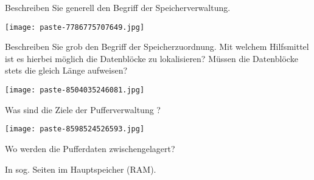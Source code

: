 \documentclass{article}
\begin{document}
\begin{tcolorbox}[colback=white!10!white,colframe=lightgray!75!black,
  savelowerto=\jobname_ex.tex]

\begin{center}
 Beschreiben Sie generell den Begriff der Speicherverwaltung. 

\end{center}

\tcblower

\justifying
\texttt{[image: paste-7786775707649.jpg]}
\end{tcolorbox}
\begin{tcolorbox}[colback=white!10!white,colframe=lightgray!75!black,
  savelowerto=\jobname_ex.tex]

\begin{center}
 Beschreiben Sie grob den Begriff der Speicherzuordnung. Mit welchem Hilfsmittel ist es hierbei möglich die Datenblöcke zu lokalisieren? Müssen die Datenblöcke stets die gleich Länge aufweisen? 

\end{center}

\tcblower

\justifying
\texttt{[image: paste-8504035246081.jpg]}
\end{tcolorbox}
\begin{tcolorbox}[colback=white!10!white,colframe=lightgray!75!black,
  savelowerto=\jobname_ex.tex]

\begin{center}
 Was sind die Ziele der 
Pufferverwaltung
? 

\end{center}

\tcblower

\justifying
\texttt{[image: paste-8598524526593.jpg]}
\end{tcolorbox}
\begin{tcolorbox}[colback=white!10!white,colframe=lightgray!75!black,
  savelowerto=\jobname_ex.tex]

\begin{center}
 Wo werden die Pufferdaten zwischengelagert? 

\end{center}

\tcblower

\justifying
In sog. 
Seiten
im Hauptspeicher (RAM).

\end{tcolorbox}
\end{document}
